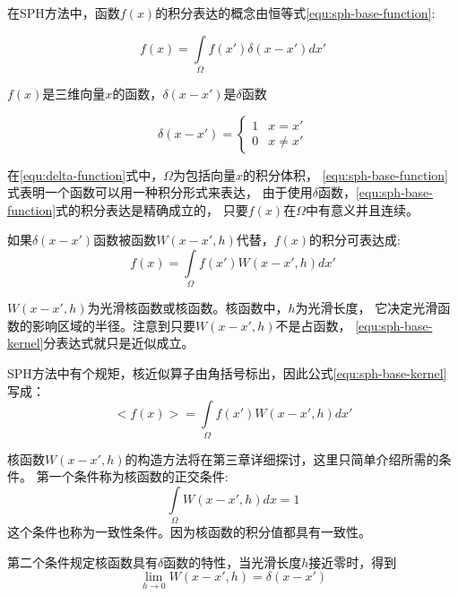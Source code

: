 在SPH方法中，函数$f(x)$的积分表达的概念由恒等式\ref{equ:sph-base-function}:

\begin{equation}
\label{equ:sph-base-function}
f(x) = \int\limits_\Omega{}f(x')\delta(x-x')dx'
\end{equation}

$f(x)$是三维向量$x$的函数，$\delta(x-x')$是$\delta$函数

\begin{equation}
\label{equ:delta-function}
\delta(x-x') = \left\{
\begin{array}{rl}
1 & x = x'\\
0 & x \ne x' 
\end{array} \right.
\end{equation}

在\ref{equ:delta-function}式中，$\Omega$为包括向量$x$的积分体积，
\ref{equ:sph-base-function}式表明一个函数可以用一种积分形式来表达，
由于使用$\delta$函数，\ref{equ:sph-base-function}式的积分表达是精确成立的，
只要$f(x)$在$\Omega$中有意义并且连续。

如果$\delta(x-x')$函数被函数$W(x-x',h)$代替，$f(x)$的积分可表达成:
\begin{equation}
\label{equ:sph-base-kernel}
f(x)=\int\limits_\Omega{}f(x')W(x-x',h)dx'
\end{equation}

$W(x-x',h)$为光滑核函数或核函数。核函数中，$h$为光滑长度，
它决定光滑函数的影响区域的半径。注意到只要$W(x-x',h)$不是占函数，
\ref{equ:sph-base-kernel}分表达式就只是近似成立。

SPH方法中有个规矩，核近似算子由角括号标出，因此公式\ref{equ:sph-base-kernel}写成：
\begin{equation}
\label{equ:sph-base-kernel:s}
< f(x) >=\int\limits_\Omega{}f(x')W(x-x',h)dx'
\end{equation}

核函数$W(x-x',h)$的构造方法将在第三章详细探讨，这里只简单介绍所需的条件。
第一个条件称为核函数的正交条件:
\begin{equation}
\label{equ:kernel-function-condition1}
\int\limits_\Omega{}W(x-x',h)dx = 1
\end{equation}
这个条件也称为一致性条件。因为核函数的积分值都具有一致性。

第二个条件规定核函数具有$\delta$函数的特性，当光滑长度$h$接近零时，得到
\begin{equation}
\label{equ:kernel-function-condition2}
\lim_{h \rightarrow 0}W(x-x',h) = \delta(x-x')
\end{equation}

